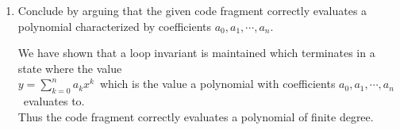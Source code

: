 \documentclass{article}
\newcommand{\?}{\stackrel{?}{=}}
\newcommand\Ans[2][]{%
   \leavevmode\noindent
   {
       \begin{mdframed}[backgroundcolor=blue!10]
       #2
       \end{mdframed}
   }
}
\begin{document}
\begin{enumerate}
    	\[
    	    y = \sum_{k=0}^n a_k x^k
    	\]
    	\Ans{
    		\begin{align*}
    		\shortintertext{Initialization: before the first iteration}
    		y &= 0 = \sum_{k=0}^{-1}a_{n+1}x^0
    		\shortintertext{since the sum bounds are invalid, the result is $0$\ which is consistent.}
    		\shortintertext{Maintenance:} 
    			y^\prime &= a_i + xy = a_ix^0 + \sum_{k=0}^{n-i-1}a_{k+i+1}x^{k+1}
    		\shortintertext{If we define $k^\prime = k+1$\ and $i^\prime=i-1$, then} 
    		    y^\prime &= a_ix^0 + \sum_{k^\prime=1}^{n-(i^\prime+1)}a_{k^\prime+(i^\prime+1)}x^{k^\prime}
    		\shortintertext{We can combine the $a_ix^0$\ term into the sum as a $k^\prime=0$ term}
    		    y^\prime &= \sum_{k^\prime=0}^{n-(i^\prime+1)}a_{k^\prime+i^\prime+1}x^{k^\prime}
    		\shortintertext{Which maintains the loop invariant for the next iteration since $i$\ is decremented each iteration.}
    		\shortintertext{Termination: At the termination of our final iteration, $i^\prime=-1$\ and}
    		   y^\prime &= \sum_{k^\prime=0}^{n-(-1+1)}a_{k^\prime+1-1}x^{k^\prime}
    		             = \sum_{k=0}^{n}a_kx^k
    		\end{align*}
    	}
    	\item Conclude by arguing that the given code fragment correctly evaluates a polynomial characterized by coefficients $a_0, a_1, \cdots, a_n$.
    	\Ans{
    	    We have shown that a loop invariant is maintained which terminates in a state where the value \\ 
    	    $y=\sum_{k=0}^na_kx^k$\ which is the value a polynomial with coefficients $a_0,a_1,\cdots,a_n$\ evaluates to.  \\
    	    Thus the code fragment correctly evaluates a polynomial of finite degree.
    	}
    \end{enumerate}
\end{document}
